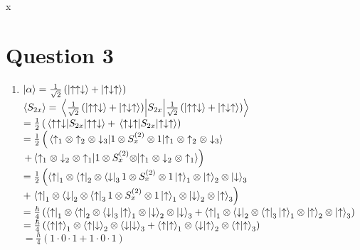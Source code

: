 x\documentclass[12pt]{article}
\begin{document}
\section*{Question 3}
\begin{enumerate}[label=\alph*)]
\item
$\ket{\alpha} = \frac{1}{\sqrt{2}}\left(\ket{\uparrow\uparrow\downarrow} + \ket{\uparrow\downarrow\uparrow}\right)$\vspace{0.5em}\\
$\ev{S_{2x}} = \ev{S_{2x}}{\frac{1}{\sqrt{2}}\left(\ket{\uparrow\uparrow\downarrow} + \ket{\uparrow\downarrow\uparrow}\right)}$\vspace{0.5em}\\
\hspace*{2.1em} $=\frac{1}{2}\left(\ev{S_{2x}}{\uparrow\uparrow\downarrow} + \ev{S_{2x}}{\uparrow\downarrow\uparrow}\right)$\vspace{0.5em}\\
\hspace*{2.1em} $= \frac{1}{2}\left( \ev{1\otimes S_x^{(2)}\otimes 1}{\uparrow_1 \otimes \uparrow_2 \otimes \downarrow_3} \right.$\vspace{0.5em}\\
\hspace*{4.1em} $\left. + \ev{1 \otimes S_x^{(2)}\otimes}{\uparrow_1 \otimes \downarrow_2 \otimes \uparrow_1}\right)$\vspace{0.5em}\\
\hspace*{2.1em} $= \frac{1}{2}\left(\bra{\uparrow}_1 \otimes \bra{\uparrow}_2 \otimes \bra{\downarrow}_3 1 \otimes S_x^{(2)} \otimes 1 \ket{\uparrow}_1 \otimes \ket{\uparrow}_2 \otimes \ket{\downarrow}_3\right.$\vspace{0.5em}\\
\hspace*{4.1em} $+ \left.\bra{\uparrow}_1 \otimes \bra{\downarrow}_2 \otimes \bra{\uparrow}_3 1 \otimes S_x^{(2)} \otimes 1 \ket{\uparrow}_1 \otimes \ket{\downarrow}_2 \otimes \ket{\uparrow}_3\right) $\vspace{0.5em}\\
\hspace*{2.1em} $= \frac{\hbar}{4}\left(\bra{\uparrow}_1 \otimes \bra{\uparrow}_2 \otimes \bra{\downarrow}_3 \ket{\uparrow}_1 \otimes \ket{\downarrow}_2 \otimes \ket{\downarrow}_3 + \bra{\uparrow}_1 \otimes \bra{\downarrow}_2 \otimes \bra{\uparrow}_3 \ket{\uparrow}_1 \otimes \ket{\uparrow}_2 \otimes \ket{\uparrow}_3\right)$\vspace{0.5em}\\
\hspace*{2.1em} $ = \frac{\hbar}{4}\left(\braket{\uparrow}{\uparrow}_1 \otimes \braket{\uparrow}{\downarrow}_2 \otimes \braket{\downarrow}{\downarrow}_3 + \braket{\uparrow}{\uparrow}_1 \otimes \braket{\downarrow}{\uparrow}_2 \otimes \braket{\uparrow}{\uparrow}_3\right)$\vspace{0.5em}\\
\hspace*{2.1em} $ = \frac{\hbar}{4}\left(1\cdot 0\cdot 1 + 1\cdot 0 \cdot 1\right)$\vspace{0.5em}


\end{enumerate}
\end{document}
